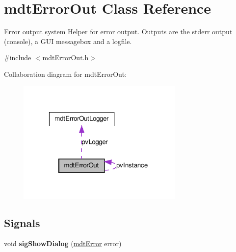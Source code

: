 \hypertarget{classmdt_error_out}{
\section{mdtErrorOut Class Reference}
\label{classmdt_error_out}
}


Error output system Helper for error output. Outputs are the stderr output (console), a GUI messagebox and a logfile.  




{\ttfamily \#include $<$mdtErrorOut.h$>$}



Collaboration diagram for mdtErrorOut:\nopagebreak
\begin{figure}[H]
\begin{center}
\leavevmode
\includegraphics[width=231pt]{classmdt_error_out__coll__graph}
\end{center}
\end{figure}
\subsection*{Signals}
\begin{DoxyCompactItemize}
\item 
\hypertarget{classmdt_error_out_a033747841ec3340f0396e574723095d7}{
void {\bfseries sigShowDialog} (\hyperlink{classmdt_error}{mdtError} error)}
\label{classmdt_error_out_a033747841ec3340f0396e574723095d7}

\end{DoxyCompactItemize}
